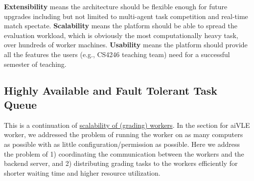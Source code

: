 \textbf{Extensibility} means the architecture should be flexible enough for future upgrades including but not limited to multi-agent task competition and real-time match spectate. \textbf{Scalability} means the platform should be able to spread the evaluation workload, which is obviously the most computationally heavy task, over hundreds of worker machines. \textbf{Usability} means the platform should provide all the features the users (e.g., CS4246 teaching team) need for a successful semester of teaching.

\subsection{Highly Available and Fault Tolerant Task Queue}
\label{ch:aivle-web_highly-available-task-queue}
This is a continuation of \hyperref[ss:aivle-worker-design-goal]{scalability of (grading) workers}. In the section for aiVLE worker, we addressed the problem of running the worker on as many computers as possible with as little configuration/permission as possible. Here we address the problem of 1) coordinating the communication between the workers and the backend server, and 2) distributing grading tasks to the workers efficiently for shorter waiting time and higher resource utilization.
